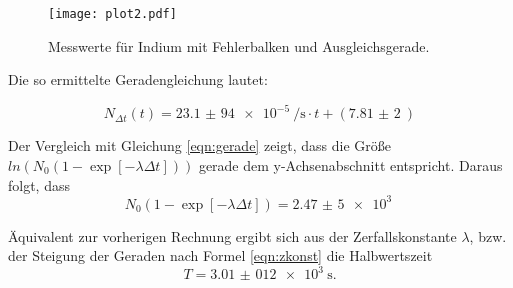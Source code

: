 \begin{figure}[H]
  \centering
  \texttt{[image: plot2.pdf]}
  \caption{Messwerte für Indium mit Fehlerbalken und Ausgleichsgerade.}
  \label{fig:plot2}
\end{figure}

Die so ermittelte Geradengleichung lautet:

\begin{equation*}
  N_{\Delta t}(t)=\SI{23,1(94)e-5}{\per\s}\cdot t + (\SI{7,81(2)}{})
\end{equation*}

Der Vergleich mit Gleichung \ref{eqn:gerade} zeigt, dass die Größe
$ln(N_0(1-\exp{[-\lambda\Delta t]}))$ gerade dem y-Achsenabschnitt entspricht.
Daraus folgt, dass
\begin{equation*}
  N_0(1-\exp{[-\lambda\Delta t]})=\SI{2,47(5)e+3}{}
\end{equation*}

Äquivalent zur vorherigen Rechnung ergibt sich aus der Zerfallskonstante $\lambda$, bzw. der
Steigung der Geraden nach Formel \ref{eqn:zkonst} die Halbwertszeit
\begin{equation*}
  T=\SI{3,01(012)e+3}{\s}.
\end{equation*}
